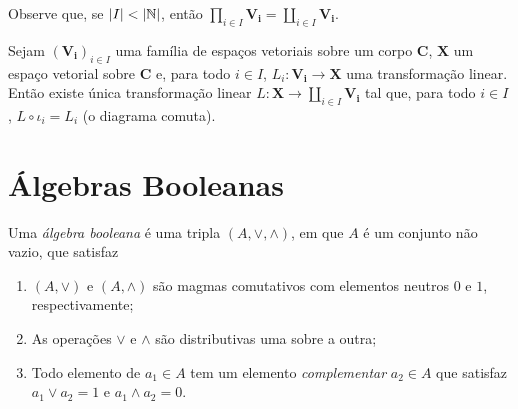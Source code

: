 Observe que, se $\left\vert{I}\right\vert < \left\vert{\mathbb{N}}\right\vert$, então $\prod_{i \in I} \bm{V_i} = \coprod_{i \in I} \bm{V_i}$.

\begin{prop}
Sejam $(\bm{V_i})_{i \in I}$ uma família de espaços vetoriais sobre um corpo $\bm C$, $\bm X$ um espaço vetorial sobre $\bm C$ e, para todo $i \in I$, $L_i: \bm{V_i} \to \bm X$ uma transformação linear. Então existe única transformação linear $L: \bm X \to \coprod_{i \in I} \bm{V_i}$ tal que, para todo $i \in I$, $L \circ \iota_i = L_i$ (o diagrama comuta).
\begin{figure}[!h]
\centering
{}
\end{figure}
\end{prop}





























\chapter{Álgebras Booleanas}

\begin{defi}
Uma \emph{álgebra booleana} é uma tripla $(A, \vee ,\wedge)$, em que $A$ é um conjunto não vazio, que satisfaz
	\begin{enumerate}
	\item $(A, \vee )$ e $(A,\wedge)$ são magmas comutativos com elementos neutros $0$ e $1$, respectivamente;
	\item As operações $ \vee $ e $\wedge$ são distributivas uma sobre a outra;
	\item Todo elemento de $a_1 \in A$ tem um elemento \emph{complementar} $a_2 \in A$ que satisfaz $a_1 \vee a_2=1$ e $a_1 \wedge a_2 = 0$.
	\end{enumerate}
\end{defi}

